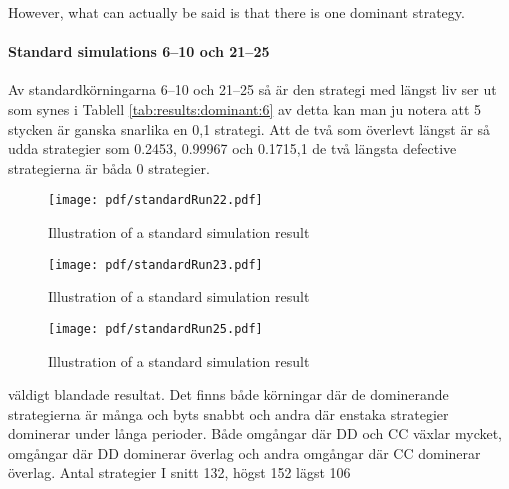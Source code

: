 However, what can actually be said is that there is one dominant strategy.\mypar

\paragraph{Standard simulations 6--10 och 21--25}
Av standardkörningarna 6--10 och 21--25 så är den strategi med längst liv ser ut som synes i Tablell \ref{tab:results:dominant:6}
av detta kan man ju notera att 5 stycken är ganska snarlika en 0,1 strategi. Att de två som överlevt längst är så udda strategier som 0.2453, 0.99967 och 0.1715,1 de två längsta defective strategierna är båda 0 strategier.\mypar

\begin{figure}[htbp]
\centering
\texttt{[image: pdf/standardRun22.pdf]}
\caption{Illustration of a standard simulation result}
\end{figure}

\begin{figure}[htbp]
\centering
\texttt{[image: pdf/standardRun23.pdf]}
\caption{Illustration of a standard simulation result}
\end{figure}

\begin{figure}[htbp]
\centering
\texttt{[image: pdf/standardRun25.pdf]}
\caption{Illustration of a standard simulation result}
\end{figure}

väldigt blandade resultat. Det finns både körningar där de dominerande strategierna är många och byts
snabbt och andra där enstaka strategier dominerar under långa perioder. Både omgångar där DD och
CC växlar mycket, omgångar där DD dominerar överlag och andra omgångar där CC dominerar
överlag. Antal strategier I snitt 132, högst 152 lägst 106\mypar

